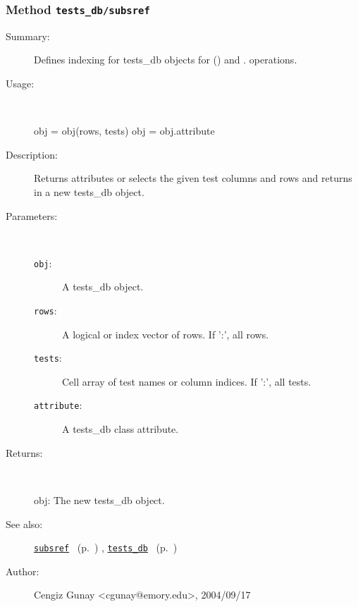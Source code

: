 \subsubsection[Method \texttt{subsref}]{Method \texttt{tests\_db/subsref}}%
%
\label{ref_tests_db__subsref}%
\hypertarget{ref_tests_db__subsref}{}%
\begin{description}
\item[Summary:]Defines indexing for tests\_db objects for () and . operations. 
%
\item[Usage:]~%
\begin{lyxcode}%
obj = obj(rows, tests)
 obj = obj.attribute
%
\end{lyxcode}%
%
\item[Description:]%
Returns attributes or selects the given test columns and rows
 and returns in a new tests\_db object.
\item[Parameters:]~
\begin{description}%
\item[\texttt{obj}:]
 A tests\_db object.
\item[\texttt{rows}:]
 A logical or index vector of rows. If ':', all rows.
\item[\texttt{tests}:]
 Cell array of test names or column indices. If ':', all tests.
\item[\texttt{attribute}:]
 A tests\_db class attribute.
\end{description}%
%
\item[Returns:
]~

	obj: The new tests\_db object.
%
%
\item[See also:]%
\hyperlink{ref_subsref}{\texttt{subsref}}%
\ (p.~\pageref{ref_subsref})%
%
, \hyperlink{ref_tests_db}{\texttt{tests\_db}}%
\ (p.~\pageref{ref_tests_db})%
%
%
\item[Author:]%
Cengiz Gunay <cgunay@emory.edu>, 2004/09/17
%
\end{description}
\methodline%
